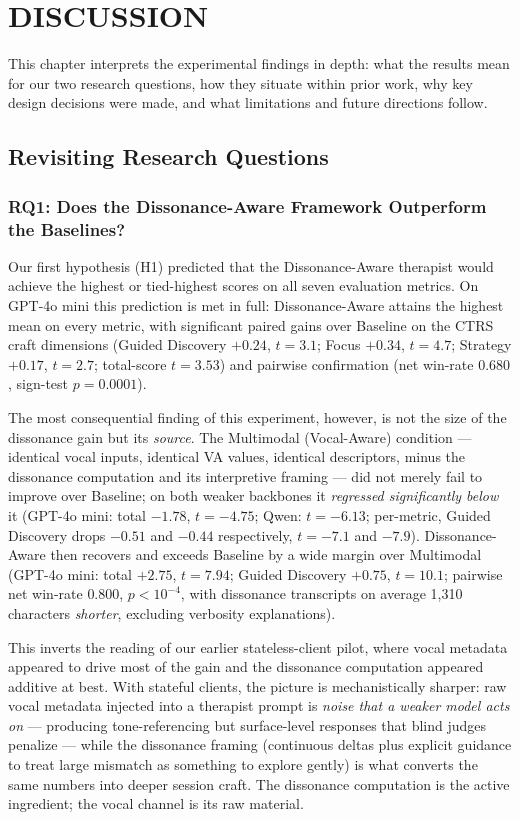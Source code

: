 \setlength{\footskip}{8mm}

\chapter{DISCUSSION}

This chapter interprets the experimental findings in depth: what the results mean for our two research questions, how they situate within prior work, why key design decisions were made, and what limitations and future directions follow.

\section{Revisiting Research Questions}

\subsection{RQ1: Does the Dissonance-Aware Framework Outperform the Baselines?}

Our first hypothesis (H1) predicted that the Dissonance-Aware therapist would achieve the highest or tied-highest scores on all seven evaluation metrics. On GPT-4o mini this prediction is met in full: Dissonance-Aware attains the highest mean on every metric, with significant paired gains over Baseline on the CTRS craft dimensions (Guided Discovery $+0.24$, $t = 3.1$; Focus $+0.34$, $t = 4.7$; Strategy $+0.17$, $t = 2.7$; total-score $t = 3.53$) and pairwise confirmation (net win-rate $0.680$, sign-test $p = 0.0001$).

The most consequential finding of this experiment, however, is not the size of the dissonance gain but its \emph{source}. The Multimodal (Vocal-Aware) condition --- identical vocal inputs, identical VA values, identical descriptors, minus the dissonance computation and its interpretive framing --- did not merely fail to improve over Baseline; on both weaker backbones it \emph{regressed significantly below} it (GPT-4o mini: total $-1.78$, $t = -4.75$; Qwen: $t = -6.13$; per-metric, Guided Discovery drops $-0.51$ and $-0.44$ respectively, $t = -7.1$ and $-7.9$). Dissonance-Aware then recovers and exceeds Baseline by a wide margin over Multimodal (GPT-4o mini: total $+2.75$, $t = 7.94$; Guided Discovery $+0.75$, $t = 10.1$; pairwise net win-rate $0.800$, $p < 10^{-4}$, with dissonance transcripts on average 1,310 characters \emph{shorter}, excluding verbosity explanations).

This inverts the reading of our earlier stateless-client pilot, where vocal metadata appeared to drive most of the gain and the dissonance computation appeared additive at best. With stateful clients, the picture is mechanistically sharper: raw vocal metadata injected into a therapist prompt is \emph{noise that a weaker model acts on} --- producing tone-referencing but surface-level responses that blind judges penalize --- while the dissonance framing (continuous deltas plus explicit guidance to treat large mismatch as something to explore gently) is what converts the same numbers into deeper session craft. The dissonance computation is the active ingredient; the vocal channel is its raw material.

